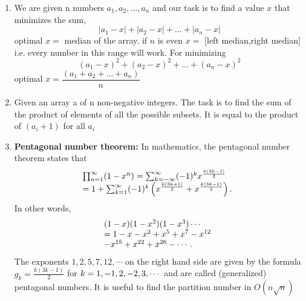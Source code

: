 \begin{enumerate}[resume]
    \[\begin{cases}
        \text{$r_1 + r_2 + \dots + r_{n - 1} + r_n = - \frac{a_{n - 1}}{a_n}$}
        \\
\begin{array}{@{}l}
(r_1r_2 + r_1r_3 + \dots + r_1r_n) \\
+ (r_2r_3 + r_2r_4 + \dots + r_2r_n) + \dots \\
+ r_{n-1}r_n
= \dfrac{a_{n-2}}{a_n}
\end{array}
        \\\vdots\\
        \text{$r_1r_2\dots r_n = (-1)^n\frac{a_0}{a_n}.$}
        \end{cases}\]
    Vieta’s formulas can equivalently be written as
    \[\displaystyle \sum_{1 \leq i_1 < i_2 < \dots <i_k \leq n} \Bigg(\prod_{j = 1}^k{r_{i_j}}\Bigg) = (-1)^k\frac{a_{n - k}}{a_n},\]
    \item We are given n numbers $\displaystyle a_1,a_2,\dots,a_n$ and our task is to find a value $\displaystyle x$ that minimizes the sum,
    \[|a_1 - x| + |a_2 - x| + \dots + |a_n - x|\]
    optimal $\displaystyle x=$ median of the array.
    if $n$ is even $\displaystyle x =$ $[$left median,right median$]$ i.e. every number in this range will work.
    For minimizing
    \[\displaystyle (a_1 - x)^2 + (a_2 - x)^2 + \dots + (a_n - x)^2\]
    optimal $\displaystyle x = \dfrac{(a_1 + a_2 + \dots + a_n)}{ n}$
    \item Given an array a of n non-negative integers. The task is to find the sum of the product of elements of all the possible subsets. It is equal to the product of $\displaystyle (a_i + 1)$ for all $\displaystyle a_i$
    \item \textbf{Pentagonal number theorem:}
    In mathematics, the pentagonal number theorem states that
    \[
\begin{array}{@{}l}
\prod_{n=1}^{\infty} (1 - x^n)
= \sum_{k=-\infty}^{\infty} (-1)^k x^{\frac{k(3k-1)}{2}} \\
= 1 + \sum_{k=1}^{\infty} (-1)^k
\left(
x^{\frac{k(3k+1)}{2}} + x^{\frac{k(3k-1)}{2}}
\right).
\end{array}
\]
    In other words,
\[
\begin{array}{@{}l}
(1 - x)(1 - x^2)(1 - x^3)\cdots
\\ = 1 - x - x^2 + x^5 + x^7 - x^{12} \\ - x^{15} + x^{22} + x^{26} - \cdots .
\end{array}
\]
    The exponents $\displaystyle 1, 2, 5, 7, 12,\cdots$ on the right hand side are given by the formula $g_k = \frac{k(3k - 1)}{2}$ for $\displaystyle \displaystyle k = 1, -1, 2, -2, 3, \cdots$ and are called (generalized) pentagonal numbers.
    It is useful to find the partition number in $O(n \sqrt{n})$
\end{enumerate}


